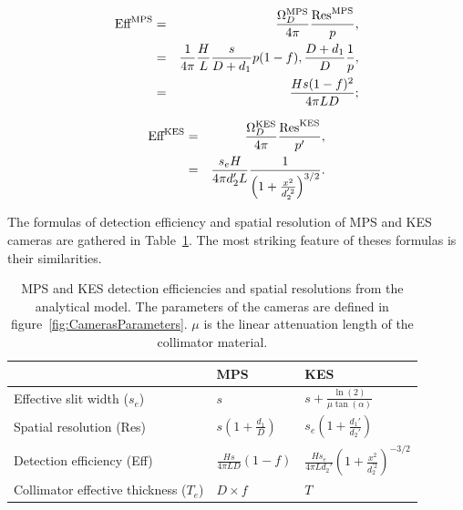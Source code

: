\documentclass[a4paper,english,12pt]{article}
\begin{document}
\begin{eqnarray}
  \label{eq:de_mps}
  \textrm{Eff}_{}^{\textrm{MPS}} & = & \frac{\Omega_D^{\textrm{MPS}}}{4\pi} \frac{\textrm{Res}_{}^{\textrm{MPS}}}{p}, \nonumber\\
                & = & \frac{1}{4\pi} \frac{H}{L} \frac{s}{D+d_1} p(1-f),
                      \frac{D+d_1}{D} \frac{1}{p} ,\nonumber\\
                & = & \frac{Hs(1-f)^2}{4 \pi L D} ;
\end{eqnarray}

\begin{eqnarray}
  \label{eq:de_kes}
	\textrm{Eff}_{}^{\textrm{KES}} & = & \frac{\Omega_D^{\textrm{KES}}}{4\pi} \frac{\textrm{Res}_{}^{\textrm{KES}}}{p'}, \nonumber\\
	& = & \frac{s_e H}{4\pi d_2' L} \frac{1}{\left( 1+\frac{x^2}{d_2^{'2}}\right)^{3/2}}.
\end{eqnarray}



The formulas of detection efficiency and spatial resolution of MPS and KES cameras are gathered in Table~\ref{table:AMformulas}. The most striking feature of theses 
formulas is their similarities. 

\begin{table}[h]
\centering
\begin{tabular}{lll}
	\midrule
	                            & MPS                              & KES \\
	\midrule
	Effective slit width ($s_e$)& $s$                              & $s + \frac{\ln(2)}{\mu \tan(\alpha)}$ \\
 	Spatial resolution (Res)		& $s \left(1+\frac{d_1}{D}\right)$ & $s_e \left( 1+\frac{d_1'}{d_2'} \right)$ \\
	Detection efficiency (Eff)	& $\frac{H s}{ 4 \pi L D } (1-f) $ & $\frac{H s_e}{ 4 \pi L d_2' } \left( 1 + \frac{x^2}{d_2^{'2}} \right)^{-3/2} $ \\
 	Collimator effective thickness ($T_e$) & $D\times f$           & $T$ \\
	\midrule
\end{tabular}
\caption{MPS and KES detection efficiencies and spatial resolutions from the analytical model. The parameters of the cameras are defined in figure~\ref{fig:CamerasParameters}. $\mu$ is the linear attenuation length of the collimator material.}
\label{table:AMformulas}
\end{table}
\end{document}
